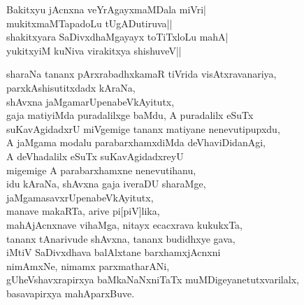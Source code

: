 \begin{entry}
\smallskip
\begin{shl}
Bakitxyu jAcnxna veYrAgayxmaMDala miVri|\\
mukitxmaMTapadoLu tUgADutiruva||\\
shakitxyara SaDivxdhaMgayayx toTiTxloLu mahA|\\
yukitxyiM kuNiva virakitxya shishuveV||
\end{shl}
\smallskip
{}
\end{entry}

\begin{entry}
\medskip

\begin{shl}
sharaNa tananx pArxrabadhxkamaR tiVrida visAtxravanariya,\\
parxkAshisutitxdadx kAraNa,\\
shAvxna jaMgamarUpenabeVkAyitutx,\\
gaja matiyiMda puradalilxge baMdu, A puradalilx eSuTx\\
suKavAgidadxrU miVgemige tananx matiyane nenevutipupxdu,\\
A jaMgama modalu parabarxhamxdiMda deVhaviDidanAgi,\\
A deVhadalilx eSuTx suKavAgidadxreyU\\
migemige A parabarxhamxne nenevutihanu,\\
idu kAraNa, shAvxna gaja iveraDU sharaMge,\\
jaMgamasavxrUpenabeVkAyitutx,\\
manave makaRTa, arive pi[piV]lika,\\
mahAjAcnxnave vihaMga, nitayx ecacxrava kukukxTa,\\
tananx tAnarivude shAvxna, tananx budidhxye gava,\\
iMtiV SaDivxdhava balAlxtane barxhamxjAcnxni\\
nimAmxNe, nimamx parxmatharANi,\\
gUheVshavxrapirxya baMkaNaNxniTaTx muMDigeyanetutxvarilalx,\\
basavapirxya mahAparxBuve.
\end{shl}
\smallskip
{}
\end{entry}

